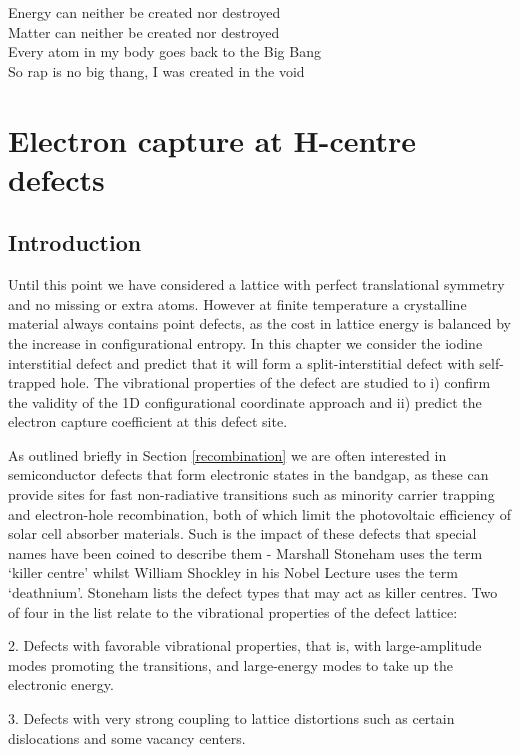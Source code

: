 \begin{savequote}[8cm]
Energy can neither be created nor destroyed \\
Matter can neither be created nor destroyed \\
Every atom in my body goes back to the Big Bang \\
So rap is no big thang, I was created in the void
\end{savequote}

\chapter{\label{ch:6-defects}Electron capture at H-centre defects}




\section{Introduction}

Until this point we have considered a lattice with perfect translational symmetry and no missing or extra atoms. However at finite temperature a crystalline material always contains point defects, as the cost in lattice energy is balanced by the increase in configurational entropy.
In this chapter we consider the iodine interstitial defect and predict that it will form a split-interstitial defect with self-trapped hole. The vibrational properties of the defect are studied to i) confirm the validity of the 1D configurational coordinate approach and ii) predict the electron capture coefficient at this defect site.

As outlined briefly in Section \ref{recombination} we are often interested in semiconductor defects that form electronic states in the bandgap, as these can provide sites for fast non-radiative transitions such as minority carrier trapping and electron-hole recombination, both of which limit the photovoltaic efficiency of solar cell absorber materials. Such is the impact of these defects that special names have been coined to describe them - Marshall Stoneham uses the term `killer centre' whilst William Shockley in his Nobel Lecture uses the term `deathnium'.\autocite{shockley}
Stoneham lists the defect types that may act as killer centres. Two of four in the list relate to the vibrational properties of the defect lattice:

\begin{displayquote}
2. Defects with favorable vibrational properties, that is, with large-amplitude modes promoting the transitions, and large-energy modes to take up the electronic energy.

3.  Defects with very strong coupling to lattice distortions such as certain dislocations and some vacancy centers.
\end{displayquote}

